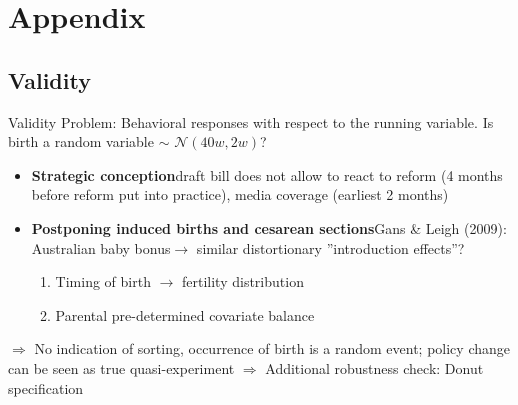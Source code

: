 \documentclass[aspectratio=169,handout]{beamer} %
\begin{document}


\section*{Appendix}
\subsection*{Validity}
\label{VALIDITY}
\begin{frame}{Validity}
Problem: Behavioral responses with respect to the running variable. Is birth a random variable $\sim$ $\mathcal{N}(40w,2w)$?\pause
\begin{itemize}
\item \textbf{Strategic conception}\newline draft bill does not allow to react to reform (4 months before reform put into practice), media coverage (earliest 2 months)

\item \textbf{Postponing induced births and cesarean sections}\newline Gans \& Leigh (2009): Australian baby bonus\newline $\rightarrow$ similar distortionary ”introduction effects”?\pause



\begin{enumerate}
\item Timing of birth $\rightarrow$ fertility distribution
\item Parental pre-determined covariate balance
\end{enumerate}
\end{itemize}\pause
\medskip
$\Rightarrow$ No indication of sorting, occurrence of birth is a random event; policy change can be seen as true quasi-experiment \newline $\Rightarrow$ Additional robustness check: Donut specification

 \hyperlink{BACK_FROM_VALIDITY}{}

\end{frame}
\end{document}
